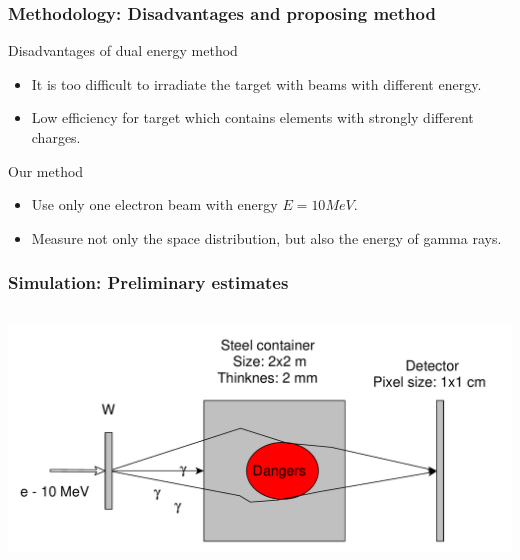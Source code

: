 \documentclass[11pt]{beamer}
\begin{document}
\begin{frame}
    \frametitle{Methodology: Disadvantages and proposing method}
    \begin{block}{Disadvantages of dual energy method}%
        \begin{itemize}
            \item It is too difficult to irradiate the target with beams with different energy.
            \item Low efficiency for target which contains elements with strongly different charges.
        \end{itemize}
    \end{block}
    \begin{block}{Our method}%
        \begin{itemize}
            \item Use only one electron beam with energy $E = 10 MeV$.
            \item Measure not only the space distribution, but also the energy of gamma rays.
        \end{itemize}
    \end{block}
\end{frame}
    \begin{frame}
    \frametitle{Simulation: Preliminary estimates}
    \begin{columns}
%                
        \begin{column}{1\textwidth} 
            \includegraphics[width=1\textwidth]{figures/yed_schema_1.pdf}
        \end{column}
    \end{columns}  
\end{frame}
\end{document}
